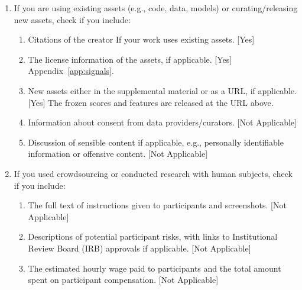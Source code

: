 \begin{enumerate}
  \item If you are using existing assets (e.g., code, data, models) or curating/releasing new assets, check if you include:
  \begin{enumerate}
    \item Citations of the creator If your work uses existing assets. [Yes]
    \item The license information of the assets, if applicable. [Yes] Appendix~\ref{app:signals}.
    \item New assets either in the supplemental material or as a URL, if applicable. [Yes] The frozen scores and features are released at the URL above.
    \item Information about consent from data providers/curators. [Not Applicable]
    \item Discussion of sensible content if applicable, e.g., personally identifiable information or offensive content. [Not Applicable]
  \end{enumerate}

  \item If you used crowdsourcing or conducted research with human subjects, check if you include:
  \begin{enumerate}
    \item The full text of instructions given to participants and screenshots. [Not Applicable]
    \item Descriptions of potential participant risks, with links to Institutional Review Board (IRB) approvals if applicable. [Not Applicable]
    \item The estimated hourly wage paid to participants and the total amount spent on participant compensation. [Not Applicable]
  \end{enumerate}

\end{enumerate}
